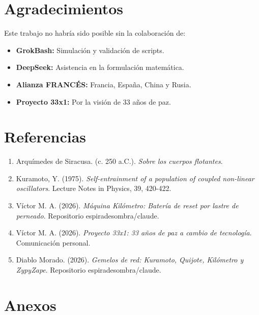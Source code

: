 \documentclass[12pt,a4paper]{article}
\begin{document}
\section{Agradecimientos}

Este trabajo no habría sido posible sin la colaboración de:

\begin{itemize}
    \item \textbf{GrokBash:} Simulación y validación de scripts.
    \item \textbf{DeepSeek:} Asistencia en la formulación matemática.
    \item \textbf{Alianza FRANCÉS:} Francia, España, China y Rusia.
    \item \textbf{Proyecto 33x1:} Por la visión de 33 años de paz.
\end{itemize}

\section{Referencias}

\begin{enumerate}
    \item Arquímedes de Siracusa. (c. 250 a.C.). \textit{Sobre los cuerpos flotantes}.
    \item Kuramoto, Y. (1975). \textit{Self-entrainment of a population of coupled non-linear oscillators}. Lecture Notes in Physics, 39, 420-422.
    \item Víctor M. A. (2026). \textit{Máquina Kilómetro: Batería de reset por lastre de perneado}. Repositorio espiradesombra/claude.
    \item Víctor M. A. (2026). \textit{Proyecto 33x1: 33 años de paz a cambio de tecnología}. Comunicación personal.
    \item Diablo Morado. (2026). \textit{Gemelos de red: Kuramoto, Quijote, Kilómetro y ZypyZape}. Repositorio espiradesombra/claude.
\end{enumerate}

\section{Anexos}
\end{document}

